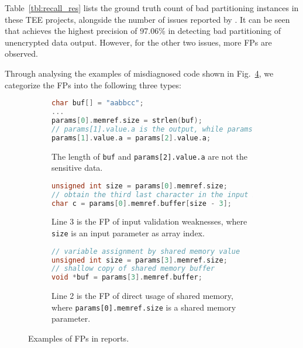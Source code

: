 Table~\ref{tbl:recall_res} lists the ground truth count of bad partitioning instances in these TEE projects, alongside the number of issues reported by \ccSysName. It can be seen that \ccSysName achieves the highest precision of 97.06\% in detecting bad partitioning of unencrypted data output. However, for the other two issues, more FPs are observed.

Through analysing the examples of misdiagnosed code shown in Fig.~\ref{fig:fp}, we categorize the FPs into the following three types:

\begin{figure}[t]
  \centering
    \begin{subfigure}[b]{\linewidth}
    \begin{lstlisting}[language=c++]
char buf[] = "aabbcc";
...
params[0].memref.size = strlen(buf);
// params[1].value.a is the output, while params[2].value.a is the input
params[1].value.a = params[2].value.a;
    \end{lstlisting}
    \caption{The length of \texttt{buf} and \texttt{params[2].value.a} are not the sensitive data.}
    \label{fig:fp1}
  \end{subfigure}
  \begin{subfigure}[b]{\linewidth}
    \begin{lstlisting}[language=c++]
unsigned int size = params[0].memref.size;
// obtain the third last character in the input buffer
char c = params[0].memref.buffer[size - 3];
    \end{lstlisting}
    \caption{Line 3 is the FP of input validation weaknesses, where \texttt{size} is an input parameter as array index.}
    \label{fig:fp2}
  \end{subfigure}
  \hfill
  \begin{subfigure}[b]{\linewidth}
    \begin{lstlisting}[language=c++]
// variable assignment by shared memory value
unsigned int size = params[3].memref.size;
// shallow copy of shared memory buffer
void *buf = params[3].memref.buffer;
    \end{lstlisting}
    \caption{Line 2 is the FP of direct usage of shared memory, where \texttt{params[0].memref.size} is a shared memory parameter.}
    \label{fig:fp3}
  \end{subfigure}
  \caption{Examples of FPs in \ccSysName reports.}
  \label{fig:fp}
\end{figure}

